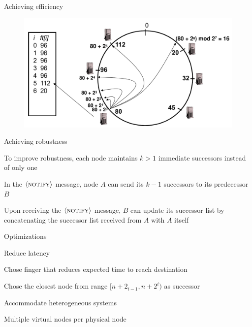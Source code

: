 \begin{frame}{Achieving efficiency}
	
\begin{figure}
	\includegraphics[width=\textwidth]{figs/10/fingers}
\end{figure}	
	
\end{frame}

\begin{frame}{Achieving robustness}
	
\BI
\item To improve robustness, each node maintains $k > 1$ immediate successors instead of only one
\item In the $\langle \textsc{notify} \rangle$ message, node $A$ can send its $k-1$ successors to its predecessor $B$
\item Upon receiving the $\langle \textsc{notify} \rangle$ message, $B$ can update its successor list 
by concatenating the successor list received from $A$ with $A$ itself
\EI
\end{frame}

\begin{frame}{Optimizations}
	
\BIL
\item \alert{Reduce latency}
	\BI
	\item Chose finger that reduces expected time to reach destination
	\item Chose the closest node from range $[n+2_{i-1},n+2^i)$ as successor
	\EI
\item \alert{Accommodate heterogeneous systems}
	\BI
	\item Multiple virtual nodes per physical node
	\EI
\EIL

\end{frame}

